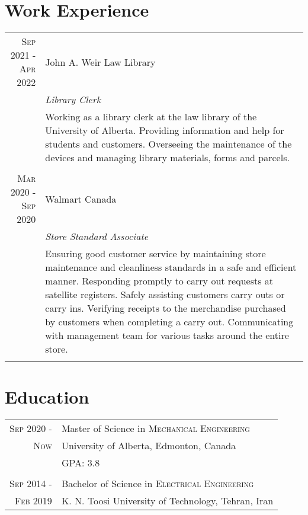 \documentclass[a4paper,10pt]{article}
\begin{document}
\section{Work Experience}
\begin{tabular}{r|p{11cm}}

\textsc{Sep 2021 -Apr 2022} & John A. Weir Law Library \textsc{}  \\\textsc{}&\emph{Library Clerk}\\&\footnotesize{Working as a library clerk at the law library of the University of Alberta. Providing information and help for students and customers. Overseeing the maintenance of the devices and managing library materials, forms and parcels.}\\\multicolumn{2}{c}{} \\

\textsc{Mar 2020 -Sep 2020} & Walmart Canada \textsc{}  \\\textsc{}&\emph{Store Standard Associate}\\&\footnotesize{Ensuring good customer service by maintaining store maintenance and cleanliness standards in a safe and efficient manner. Responding promptly to carry out requests at satellite registers. Safely assisting customers carry outs or carry ins. Verifying receipts to the merchandise purchased by customers when completing a carry out. Communicating with management team for various tasks around the entire store. }\\\multicolumn{2}{c}{} \\



\end{tabular}


\section{Education}
\begin{tabular}{rl}	

 \textsc{Sep 2020 -} & Master of Science in \textsc{Mechanical Engineering}  \\
 \textsc{Now} & University of Alberta, Edmonton, Canada \\
&\normalsize \textsc{GPA}: 3.8 \\
 \\

 \textsc{Sep 2014 -} & Bachelor of Science in \textsc{Electrical Engineering} \\
 \textsc{Feb 2019} & K. N. Toosi University of Technology, Tehran, Iran \\


\end{tabular}
\end{document}
